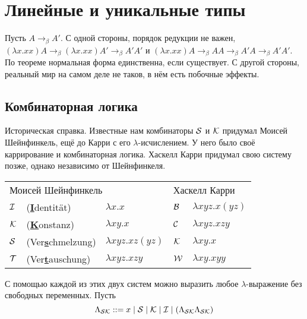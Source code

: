 \section{\texorpdfstring{Линейные и уникальные типы}{Linear and unique types}}

Пусть $A \to_\beta A'$.
С одной стороны, порядок редукции не важен, %
$(\lambda x . x x) A \to_\beta (\lambda x . x x) A' \to_\beta A' A'$
и $(\lambda x . x x) A \to_\beta A A \to_\beta A' A \to_\beta A' A'$.
По теореме  нормальная форма единственна, если существует.
С другой стороны, реальный мир на самом деле не таков, в нём есть побочные эффекты.

\subsection{\texorpdfstring{Комбинаторная логика}{Combinatory logic}}

Историческая справка. Известные нам комбинаторы $\operatorname{\mathcal{S}}$ и $\operatorname{\mathcal{K}}$ придумал Моисей Шейнфинкель,
ещё до Карри с его $\lambda$-исчислением.
У него было своё каррирование и комбинаторная логика.
Хаскелл Карри придумал свою систему позже, однако независимо от Шейнфинкеля.

\begin{center} \newcommand{\eemph}[1]{\underline{\textbf{#1}}}
\begin{tabular}{l l l l l} \toprule
    \multicolumn{3}{l}{Моисей Шейнфинкель} & \multicolumn{2}{l}{Хаскелл Карри} \\ \cmidrule(lr){1-3} \cmidrule(lr){4-5}
    $\operatorname{\mathcal{I}}$ & (\eemph{I}dentität)     & $\lambda x . x$             & $\operatorname{\mathcal{B}}$ & $\lambda x y z . x (y z)$ \\
    $\operatorname{\mathcal{K}}$ & (\eemph{K}onstanz)      & $\lambda x y . x$           & $\operatorname{\mathcal{C}}$ & $\lambda x y z . x z y$   \\
    $\operatorname{\mathcal{S}}$ & (Ver\eemph{s}chmelzung) & $\lambda x y z . x z (y z)$ & $\operatorname{\mathcal{K}}$ & $\lambda x y . x$         \\
    $\operatorname{\mathcal{T}}$ & (Ver\eemph{t}auschung)  & $\lambda x y z . x z y$     & $\operatorname{\mathcal{W}}$ & $\lambda x y . x y y$ \\ \bottomrule
\end{tabular} %
\end{center}

С помощью каждой из этих двух систем можно выразить любое $\lambda$-выражение без свободных переменных.
Пусть
\[
    \Lambda_{\operatorname{\mathcal{SK}}} ::= x \mid \operatorname{\mathcal{S}} \mid \operatorname{\mathcal{K}} \mid \operatorname{\mathcal{I}} \mid (\Lambda_{\operatorname{\mathcal{SK}}} \Lambda_{\operatorname{\mathcal{SK}}})
\]

